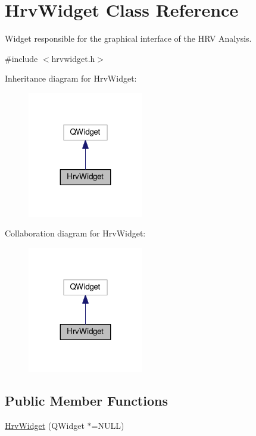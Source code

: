 \hypertarget{classHrvWidget}{}\section{Hrv\+Widget Class Reference}
\label{classHrvWidget}


Widget responsible for the graphical interface of the H\+RV Analysis.  




{\ttfamily \#include $<$hrvwidget.\+h$>$}



Inheritance diagram for Hrv\+Widget\+:\nopagebreak
\begin{figure}[H]
\begin{center}
\leavevmode
\includegraphics[width=143pt]{classHrvWidget__inherit__graph}
\end{center}
\end{figure}


Collaboration diagram for Hrv\+Widget\+:\nopagebreak
\begin{figure}[H]
\begin{center}
\leavevmode
\includegraphics[width=143pt]{classHrvWidget__coll__graph}
\end{center}
\end{figure}
\subsection*{Public Member Functions}
\begin{DoxyCompactItemize}
\item 
\hyperlink{classHrvWidget_adfd3a1b7a3c35e4380208cbe8d620c88}{Hrv\+Widget} (Q\+Widget $\ast$=N\+U\+LL)
\end{DoxyCompactItemize}


